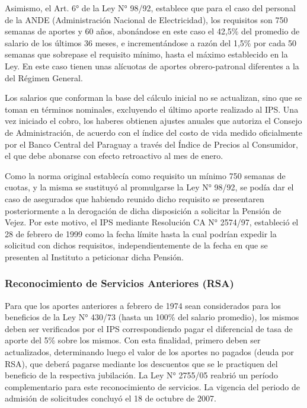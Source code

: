 Asimismo, el Art. 6° de la Ley N° 98/92, establece que para el caso del personal de la ANDE (Administración Nacional de Electricidad), los requisitos son 750 semanas de aportes y 60 años, abonándose en este caso el 42,5\% del promedio de salario de los últimos 36 meses, e incrementándose a razón del 1,5\% por cada 50 semanas que sobrepase el requisito mínimo, hasta el máximo establecido en la Ley. En este caso tienen unas alícuotas de aportes obrero-patronal diferentes a la del Régimen General.

Los salarios que conforman la base del cálculo inicial no se actualizan, sino que se toman en términos nominales, excluyendo el último aporte realizado al IPS. Una vez iniciado el cobro, los haberes obtienen ajustes anuales que autoriza el Consejo de Administración, de acuerdo con el índice del costo de vida medido oficialmente por el Banco Central del Paraguay a través del Índice de Precios al Consumidor, el que debe abonarse con efecto retroactivo al mes de enero.

Como la norma original establecía como requisito un mínimo 750 semanas de cuotas, y la misma se sustituyó al promulgarse la Ley N° 98/92, se podía dar el caso de asegurados que habiendo reunido dicho requisito se presentaren posteriormente a la derogación de dicha disposición a solicitar la Pensión de Vejez. Por este motivo, el IPS mediante Resolución CA N° 2574/97, estableció el 28 de febrero de 1999 como la fecha límite hasta la cual podrían expedir la solicitud con dichos requisitos, independientemente de la fecha en que se presenten al Instituto a peticionar dicha Pensión. 

\subsubsection{Reconocimiento de Servicios Anteriores (RSA)}

Para que los aportes anteriores a febrero de 1974 sean considerados para los beneficios de la Ley N° 430/73 (hasta un 100\% del salario promedio), los mismos deben ser verificados por el IPS correspondiendo pagar el diferencial de tasa de aporte del 5\% sobre los mismos. Con esta finalidad, primero deben ser actualizados, determinando luego el valor de los aportes no pagados (deuda por RSA), que deberá pagarse mediante los descuentos que se le practiquen del beneficio de la respectiva jubilación. La Ley N° 2755/05 reabrió un período complementario para este reconocimiento de servicios. La vigencia del periodo de admisión de solicitudes concluyó el 18 de octubre de 2007.

